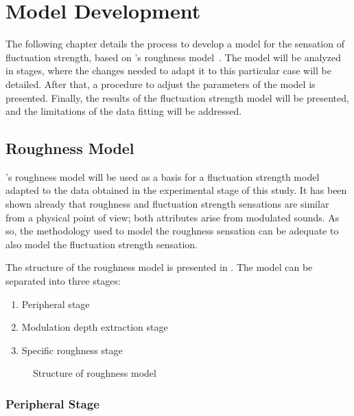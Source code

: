 \documentclass[../main.tex]{subfiles}
\begin{document}
\chapter{Model Development}

\begin{modelchapter}

The following chapter details the process to develop a model for the sensation
of fluctuation strength, based on \citeauthor{daniel1997psychoacoustical}'s
roughness model~\cite{daniel1997psychoacoustical}. The model will be analyzed in
stages, where the changes needed to adapt it to this particular case will be
detailed. After that, a procedure to adjust the parameters of the model is
presented. Finally, the results of the fluctuation strength model will be
presented, and the limitations of the data fitting will be addressed.

\section{Roughness Model}

\citeauthor{daniel1997psychoacoustical}'s roughness model
\cite{daniel1997psychoacoustical}will be used as a basis for a fluctuation
strength model adapted to the data obtained in the experimental stage of this
study. It has been shown already that roughness and fluctuation strength
sensations are similar from a physical point of view; both attributes arise from
modulated sounds. As so, the methodology used to model the roughness sensation
can be adequate to also model the fluctuation strength sensation.

The structure of the roughness model is presented in .
The model can be separated into three stages:
\begin{enumerate}
  \item Peripheral stage
  \item Modulation depth extraction stage
  \item Specific roughness stage
\end{enumerate}

\begin{figure}[!ht]
  \centering
  \resizebox{!}{15cm}{}
  \caption%
    {Structure of roughness model~\cite[pp.~116]{daniel1997psychoacoustical}}
\label{fig:roughness_model}
\end{figure}

\subsection{Peripheral Stage}


\end{modelchapter}
\end{document}
